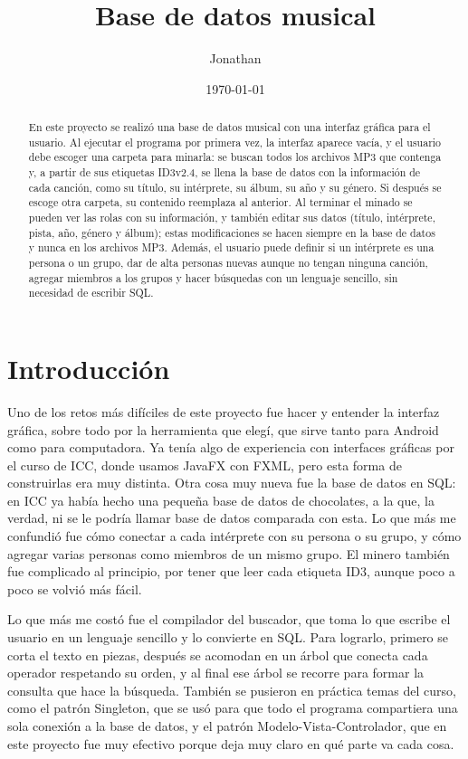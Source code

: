 \documentclass[12pt,letterpaper]{article}
\title{Base de datos musical}
\author{Jonathan}
\date{\today}
\begin{document}
\maketitle

\begin{abstract}
En este proyecto se realizó una base de datos musical con una interfaz
gráfica para el usuario. Al ejecutar el programa por primera vez, la
interfaz aparece vacía, y el usuario debe escoger una carpeta para
minarla: se buscan todos los archivos MP3 que contenga y, a partir de sus
etiquetas ID3v2.4, se llena la base de datos con la información de cada
canción, como su título, su intérprete, su álbum, su año y su género. Si
después se escoge otra carpeta, su contenido reemplaza al anterior. Al
terminar el minado se pueden ver las rolas con su información, y también
editar sus datos (título, intérprete, pista, año, género y álbum); estas
modificaciones se hacen siempre en la base de datos y nunca en los
archivos MP3. Además, el usuario puede definir si un intérprete es una
persona o un grupo, dar de alta personas nuevas aunque no tengan ninguna
canción, agregar miembros a los grupos y hacer búsquedas con un lenguaje
sencillo, sin necesidad de escribir SQL.
\end{abstract}

\tableofcontents

\section{Introducción}

Uno de los retos más difíciles de este proyecto fue hacer y entender la
interfaz gráfica, sobre todo por la herramienta que elegí, que sirve tanto
para Android como para computadora. Ya tenía algo de experiencia con
interfaces gráficas por el curso de ICC, donde usamos JavaFX con FXML, pero
esta forma de construirlas era muy distinta. Otra cosa muy nueva fue la
base de datos en SQL: en ICC ya había hecho una pequeña base de datos de
chocolates, a la que, la verdad, ni se le podría llamar base de datos
comparada con esta. Lo que más me confundió fue cómo conectar a cada
intérprete con su persona o su grupo, y cómo agregar varias personas como
miembros de un mismo grupo. El minero también fue complicado al principio,
por tener que leer cada etiqueta ID3, aunque poco a poco se volvió más
fácil.

Lo que más me costó fue el compilador del buscador, que toma lo que
escribe el usuario en un lenguaje sencillo y lo convierte en SQL. Para
lograrlo, primero se corta el texto en piezas, después se acomodan en un
árbol que conecta cada operador respetando su orden, y al final ese árbol
se recorre para formar la consulta que hace la búsqueda. También se
pusieron en práctica temas del curso, como el patrón Singleton, que se usó
para que todo el programa compartiera una sola conexión a la base de
datos, y el patrón Modelo-Vista-Controlador, que en este proyecto fue muy
efectivo porque deja muy claro en qué parte va cada cosa.
\end{document}
